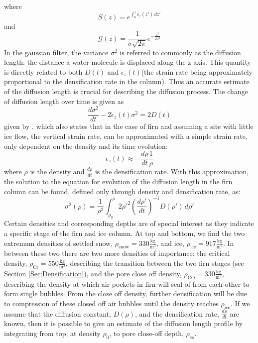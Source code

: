 \documentclass[../../CompleteThesis/Complete_1stDraft.tex]{subfiles}
\begin{document}
where
\begin{equation}
	S(z) = e^{\int_{0}^{z}\dot{\epsilon}_z(z')\, dz'}
	\label{eq:Thinning_fct}
\end{equation}
and
\begin{equation}
	\mathcal{G}(z) = \frac{1}{\sigma\sqrt{2\pi}}e^{-\frac{z^2}{2\sigma^2}}
	\label{eq:Gauss_filter}
\end{equation}
In the gaussian filter, the variance $\sigma^2$ is referred to commonly as the diffusion length: the distance a water molecule is displaced along the z-axis. This quantity is directly related to both $D(t)$ and $\dot{\epsilon}_z(t)$(the strain rate being approximately proportional to the densification rate in the column). Thus an accurate estimate of the diffusion length is crucial for describing the diffusion process.
The change of diffusion length over time is given as 
\begin{equation}
	\frac{d\sigma^2}{dt} - 2\dot{\epsilon}_z (t)\sigma^2 = 2 D(t)
	\label{eq:Evolution_DiffLen}
\end{equation}
given by \cite[Johnsen, 1977]{Johnsen1977}, which also states that in the case of firn and assuming a site with little ice flow, the vertical strain rate, can be approximated with a simple strain rate, only dependent on the density and its time evolution:
\begin{equation}
	\dot{\epsilon}_z(t) \approx - \frac{d\rho}{dt}\frac{1}{\rho}
	\label{eq:strain_rate_approx}
\end{equation}
where $\rho$ is the density and $\frac{d\rho}{dt}$ is the densification rate. With this approximation, the solution to the equation for evolution of the diffusion length in the firn column can be found, defined only through density and densification rate, as:
\begin{equation}
	\sigma^2(\rho) =\frac{1}{\rho^2} \int_{\rho_0}^{\rho}2\rho'^2\left(\frac{d\rho'}{dt}\right)^{-1} D(\rho') \, d\rho'
	\label{eq:Diff_Len_Firn}
\end{equation}
Certain densities and corresponding depths are of special interest as they indicate a specific stage of the firn and ice column. At top and bottom, we find the two extremum densities of settled snow, $\rho_{\text{snow}} = 330 \frac{\text{kg}}{\text{m}^3}$, and ice, $\rho_{\text{ice}} = 917 \frac{\text{kg}}{\text{m}^3}$. In between these two there are two more densities of importance: the critical density, $\rho_{\text{Cr}} = 550 \frac{\text{kg}}{\text{m}^3}$, describing the transition between the two firn stages (see Section \ref{Sec:Densification}), and the pore close off density, $\rho_{\text{CO}} = 330 \frac{\text{kg}}{\text{m}^3}$, describing the density at which air pockets in firn will seal of from each other to form single bubbles. From the close off density, further densification will be due to compression of these closed off air bubbles until the density reaches $\rho_{\text{ice}}$.
If we assume that the diffusion constant, $D(\rho)$, and the densification rate, $\frac{d\rho}{dt}$ are known, then it is possible to give an estimate of the diffusion length profile by integrating from top, at density $\rho_0$, to pore close-off depth, $\rho_{co}$.
\end{document}
